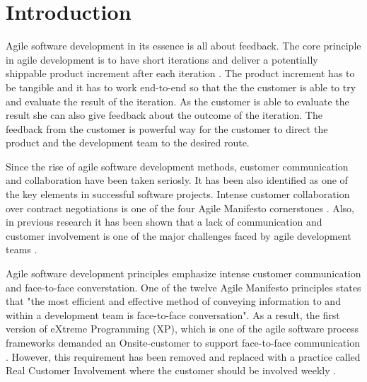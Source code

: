 \documentclass[english,12pt,a4paper,pdftex]{article}
\begin{document}
\storeinipagenumber
{}
\setcounter{page}{1}

\clearpage

\section{Introduction}

Agile software development in its essence is all about feedback. The core principle in agile development is to have short iterations and deliver a potentially shippable product increment after each iteration \citep{schwaber2009agile}. The product increment has to be tangible and it has to work end-to-end so that the the customer is able to try and evaluate the result of the iteration. As the customer is able to evaluate the result she can also give feedback about the outcome of the iteration. The feedback from the customer is powerful way for the customer to direct the product and the development team to the desired route.

Since the rise of agile software development methods, customer communication and collaboration have been taken seriosly. It has been also identified as one of the key elements in successful software projects. Intense customer collaboration over contract negotiations is one of the four Agile Manifesto cornerstones \citep{agilemanifesto}. Also, in previous research it has been shown that a lack of communication and customer involvement is one of the major challenges faced by agile development teams \citep{korkala2006}.

Agile software development principles emphasize intense customer communication and face-to-face converstation. One of the twelve Agile Manifesto principles states that "the most efficient and effective method of conveying information to and within a development team is face-to-face conversation". \citep{agilemanifesto} As a result, the first version of eXtreme Programming (XP), which is one of the agile software process frameworks demanded an Onsite-customer to support face-to-face communication \citep{beck2004}. However, this requirement has been removed and replaced with a practice called Real Customer Involvement where the customer should be involved weekly \citep{korkala2006}.
\end{document}
